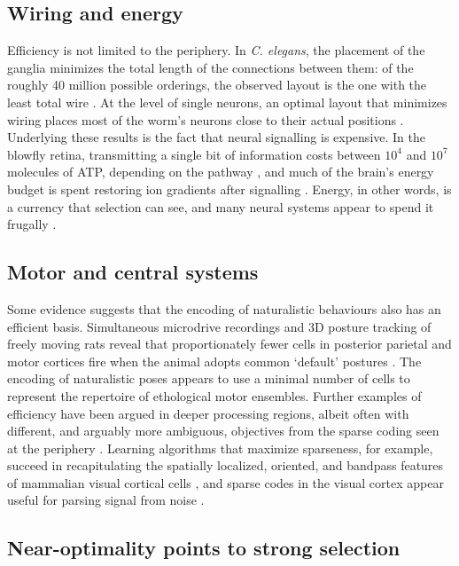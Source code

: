 \documentclass[twocolumn]{article}
\begin{document}
\subsection{Wiring and energy}

Efficiency is not limited to the periphery. In \textit{C. elegans}, the placement of the ganglia minimizes the total length of the connections between them: of the roughly 40 million possible orderings, the observed layout is the one with the least total wire \cite{Cherniak_1994}. At the level of single neurons, an optimal layout that minimizes wiring places most of the worm's neurons close to their actual positions \cite{Chen_Hall_2006}. Underlying these results is the fact that neural signalling is expensive. In the blowfly retina, transmitting a single bit of information costs between $10^4$ and $10^7$ molecules of ATP, depending on the pathway \cite{Laughlin_deRuyterVanSteveninck_1998}, and much of the brain's energy budget is spent restoring ion gradients after signalling \cite{sengupta_2010, Niven_Laughlin_2008}. Energy, in other words, is a currency that selection can see, and many neural systems appear to spend it frugally \cite{Niven_Laughlin_2008}.

\subsection{Motor and central systems}

Some evidence suggests that the encoding of naturalistic behaviours also has an efficient basis. Simultaneous microdrive recordings and 3D posture tracking of freely moving rats reveal that proportionately fewer cells in posterior parietal and motor cortices fire when the animal adopts common `default' postures \cite{Mimica_Dunn_Tombaz_Bojja_Whitlock_2018}. The encoding of naturalistic poses appears to use a minimal number of cells to represent the repertoire of ethological motor ensembles. Further examples of efficiency have been argued in deeper processing regions, albeit often with different, and arguably more ambiguous, objectives from the sparse coding seen at the periphery \cite{simoncelli_2003}. Learning algorithms that maximize sparseness, for example, succeed in recapitulating the spatially localized, oriented, and bandpass features of mammalian visual cortical cells \cite{olshausen_field_1996}, and sparse codes in the visual cortex appear useful for parsing signal from noise \cite{ringach_malone_2007}.

\subsection{Near-optimality points to strong selection}
\end{document}
